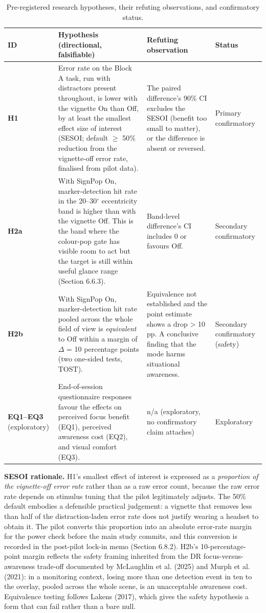\begin{longtable}{p{}|p{}|p{}|p{}}
\caption{Pre-registered research hypotheses, their refuting observations, and confirmatory status.}\\
\hline
\textbf{ID} & \textbf{Hypothesis (directional, falsifiable)} & \textbf{Refuting observation} & \textbf{Status} \\
\hline
\endhead
\hline
\textbf{H1} & Error rate on the Block A task, run with distractors present throughout, is lower with the vignette On than Off, by at least the smallest effect size of interest (SESOI; default $\geq$ 50\% reduction from the vignette-off error rate, finalised from pilot data). & The paired difference's 90\% CI excludes the SESOI (benefit too small to matter), or the difference is absent or reversed. & Primary confirmatory \\
\textbf{H2a} & With SignPop On, marker-detection hit rate in the 20–30$^{\circ}$ eccentricity band is higher than with the vignette Off. This is the band where the colour-pop gate has visible room to act but the target is still within useful glance range (Section 6.6.3). & Band-level difference's CI includes 0 or favours Off. & Secondary confirmatory \\
\textbf{H2b} & With SignPop On, marker-detection hit rate pooled across the whole field of view is \textit{equivalent} to Off within a margin of $\Delta$ = 10 percentage points (two one-sided tests, TOST). & Equivalence not established and the point estimate shows a drop > 10 pp. A conclusive finding that the mode harms situational awareness. & Secondary confirmatory (safety) \\
\textbf{EQ1–EQ3} (exploratory) & End-of-session questionnaire responses favour the effects on perceived focus benefit (EQ1), perceived awareness cost (EQ2), and visual comfort (EQ3). & n/a (exploratory, no confirmatory claim attaches) & Exploratory \\
\hline
\end{longtable}

\textbf{SESOI rationale.} H1's smallest effect of interest is expressed as a \textit{proportion of the
vignette-off error rate} rather than as a raw error count, because the raw error rate depends on
stimulus tuning that the pilot legitimately adjusts. The 50\% default embodies a defensible practical
judgement: a vignette that removes less than half of the distraction-laden error rate does not justify
wearing a headset to obtain it. The pilot converts this proportion into an absolute error-rate margin
for the power check before the main study commits, and this conversion is recorded in the post-pilot
lock-in memo (Section 6.8.2). H2b's 10-percentage-point margin reflects the safety framing inherited
from the DR focus-versus-awareness trade-off documented by McLaughlin et al. (2025) and Murph et al.
(2021): in a monitoring context, losing more than one detection event in ten to the overlay,
pooled across the whole scene, is an unacceptable awareness cost. Equivalence testing follows Lakens
(2017), which gives the safety hypothesis a form that can fail rather than a bare null.

